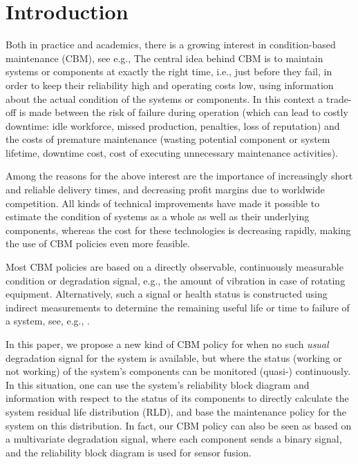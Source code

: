\documentclass[authoryear]{elsarticle}
\begin{document}

\section{Introduction}
\label{intro}

Both in practice and academics,
there is a growing interest in condition-based maintenance (CBM), see e.g.,
\citet{2017:oldekeizer}
The central idea behind CBM is to maintain systems or components at exactly the right time,
i.e., just before they fail, %
in order to keep their reliability high and operating costs low,
using information about the actual condition of the systems or components.
In this context a trade-off is made between the risk of failure during operation
(which can lead to costly downtime: idle workforce, missed production, penalties, loss of reputation)
and the costs of premature maintenance (wasting potential component or system lifetime,
downtime cost, cost of executing unnecessary maintenance activities).

Among the reasons for the above interest are the importance of increasingly short and
reliable delivery times, and decreasing profit margins due to worldwide competition.
All kinds of technical improvements have made it possible %
to estimate the condition of systems as a whole as well as their underlying components,
whereas the cost for these technologies is decreasing rapidly,
making the use of CBM policies even more feasible.

Most CBM policies are based on a directly observable, continuously measurable condition or degradation signal,
e.g., the amount of vibration in case of rotating equipment.
Alternatively, such a signal or health status is constructed
using indirect measurements to determine the remaining useful life or time to failure of a system,
see, e.g., \citet{2014:rul-review, 2011:rul-review-statistical}.

In this paper, we propose a new kind of CBM policy
for when no such \emph{usual} degradation signal for the system is available,
but where the status (working or not working) of the system's components can be monitored (quasi-) continuously.
In this situation, one can use the system's reliability block diagram
and information with respect to the status of its components
to directly calculate the system residual life distribution (RLD),
and base the maintenance policy for the system on this distribution.
In fact, our CBM policy can also be seen as based on a multivariate degradation signal,
where each component sends a binary signal, and the reliability block diagram is used for sensor fusion.
\end{document}
